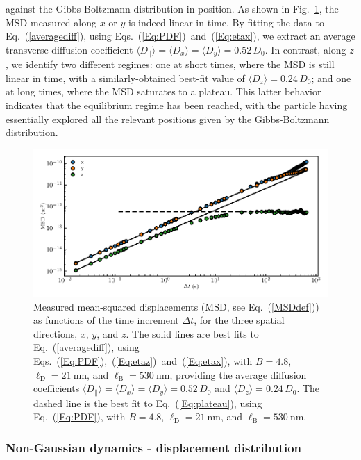 against the Gibbs-Boltzmann distribution in position. As shown in Fig.~\ref{fig.MSD}, the MSD measured along $x$ or $y$ is indeed linear in time. By fitting the data to Eq.~(\ref{averagediff}), using Eqs.~(\ref{Eq:PDF})~and~(\ref{Eq:etax}), we extract an average transverse diffusion coefficient $\langle D_\parallel \rangle= \langle D_x\rangle=\langle D_y \rangle= 0.52\, D_0$. In contrast, along $z$, we identify two different regimes: one at short times, where the \gls{MSD} is still linear in time, with a similarly-obtained best-fit value of $\langle D_z \rangle= 0.24\, D_0$; and one at long times, where the MSD saturates to a plateau. This latter behavior indicates that the equilibrium regime has been reached, with the particle having essentially explored all the relevant positions given by the Gibbs-Boltzmann distribution.

\begin{figure}[t!]
	\centering
	\includegraphics{02_body/chapter3/images/trajctory_analysis/msd.pdf}
	\caption{Measured mean-squared displacements (MSD, see Eq.~(\ref{MSDdef})) as functions of the time increment $\Delta t$, for the three spatial directions, $x$, $y$, and $z$. The solid lines are best fits to Eq.~(\ref{averagediff}), using Eqs.~(\ref{Eq:PDF}),~(\ref{Eq:etaz})~and~(\ref{Eq:etax}), with $B = 4.8$, $\ell_\mathrm{D} = 21 ~ \mathrm{nm}$, and $\ell_\mathrm{B} = 530~\mathrm{nm}$,
		providing the average diffusion coefficients $\langle{D_\parallel}\rangle= \langle D_x\rangle=\langle D_y \rangle =0.52\,D_0$ and $\langle D_z \rangle =0.24\, D_0$. The dashed line is the best fit to Eq.~(\ref{Eq:plateau}), using Eq.~(\ref{Eq:PDF}), with $B = 4.8$, $\ell_\mathrm{D} = 21 ~ \mathrm{nm}$, and $\ell_\mathrm{B} = 530~\mathrm{nm}$.}
	\label{fig.MSD}
\end{figure}


\subsubsection{Non-Gaussian dynamics - displacement distribution}

